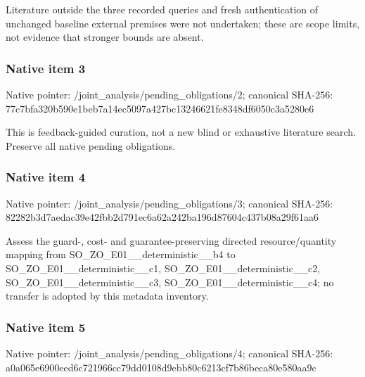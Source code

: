 \documentclass[10pt,a4paper]{article}
\begin{document}
\begingroup\raggedright\sloppy Literature outside the three recorded queries and fresh authentication of unchanged baseline external premises were not undertaken;\allowbreak{} these are scope limits,\allowbreak{} not evidence that stronger bounds are absent.\par\endgroup

\subsubsection{Native item 3}
Native pointer: /joint\_\allowbreak{}analysis/pending\_\allowbreak{}obligations/2; canonical SHA-256: 77c7bfa320b590e1beb7a14ec5097a427bc13246621fe8348df6050c3a5280e6

\begingroup\raggedright\sloppy This is feedback-guided curation,\allowbreak{} not a new blind or exhaustive literature search. Preserve all native pending obligations.\par\endgroup

\subsubsection{Native item 4}
Native pointer: /joint\_\allowbreak{}analysis/pending\_\allowbreak{}obligations/3; canonical SHA-256: 82282b3d7aedac39e42fbb2d791ec6a62a242ba196d87604c437b08a29f61aa6

\begingroup\raggedright\sloppy Assess the guard-,\allowbreak{} cost- and guarantee-preserving directed resource/\allowbreak{}quantity mapping from SO\_\allowbreak{}ZO\_\allowbreak{}E01\_\allowbreak{}\_\allowbreak{}deterministic\_\allowbreak{}\_\allowbreak{}b4 to SO\_\allowbreak{}ZO\_\allowbreak{}E01\_\allowbreak{}\_\allowbreak{}deterministic\_\allowbreak{}\_\allowbreak{}c1,\allowbreak{} SO\_\allowbreak{}ZO\_\allowbreak{}E01\_\allowbreak{}\_\allowbreak{}deterministic\_\allowbreak{}\_\allowbreak{}c2,\allowbreak{} SO\_\allowbreak{}ZO\_\allowbreak{}E01\_\allowbreak{}\_\allowbreak{}deterministic\_\allowbreak{}\_\allowbreak{}c3,\allowbreak{} SO\_\allowbreak{}ZO\_\allowbreak{}E01\_\allowbreak{}\_\allowbreak{}deterministic\_\allowbreak{}\_\allowbreak{}c4;\allowbreak{} no transfer is adopted by this metadata inventory.\par\endgroup

\subsubsection{Native item 5}
Native pointer: /joint\_\allowbreak{}analysis/pending\_\allowbreak{}obligations/4; canonical SHA-256: a0a065e6900eed6c721966cc79dd0108d9ebb80c6213cf7b86beca80e580aa9c
\end{document}
